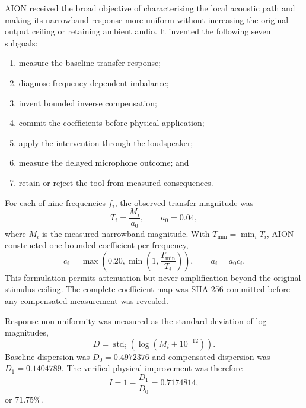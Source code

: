 AION received the broad objective of characterising the local acoustic path and
making its narrowband response more uniform without increasing the original
output ceiling or retaining ambient audio.  It invented the following seven
subgoals:
\begin{enumerate}
 \item measure the baseline transfer response;
 \item diagnose frequency-dependent imbalance;
 \item invent bounded inverse compensation;
 \item commit the coefficients before physical application;
 \item apply the intervention through the loudspeaker;
 \item measure the delayed microphone outcome; and
 \item retain or reject the tool from measured consequences.
\end{enumerate}

For each of nine frequencies $f_i$, the observed transfer magnitude was
\begin{equation}
 T_i=\frac{M_i}{a_0}, \qquad a_0=0.04,
\end{equation}
where $M_i$ is the measured narrowband magnitude.  With
$T_{\min}=\min_i T_i$, AION constructed one bounded coefficient per frequency,
\begin{equation}
 c_i=\max\!\left(0.20,
       \min\!\left(1,\frac{T_{\min}}{T_i}\right)\right),
 \qquad a_i=a_0c_i .
\end{equation}
This formulation permits attenuation but never amplification beyond the
original stimulus ceiling.  The complete coefficient map was SHA-256 committed
before any compensated measurement was revealed.

Response non-uniformity was measured as the standard deviation of log
magnitudes,
\begin{equation}
 D=\operatorname{std}_{i}\!\left(\log(M_i+10^{-12})\right).
\end{equation}
Baseline dispersion was $D_0=0.4972376$ and compensated dispersion was
$D_1=0.1404789$.  The verified physical improvement was therefore
\begin{equation}
 I=1-\frac{D_1}{D_0}=0.7174814,
\end{equation}
or $71.75\%$.

